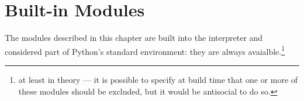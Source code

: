 \chapter{Built-in Modules}

The modules described in this chapter are built into the interpreter
and considered part of Python's standard environment: they are always
avaialble.\footnote{at least in theory --- it is possible to specify
at build time that one or more of these modules should be excluded,
but it would be antisocial to do so.}
